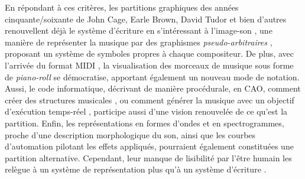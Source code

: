 En répondant à ces critères, les partitions graphiques des années cinquante/soixante de John Cage, Earle Brown, David Tudor et bien d'autres renouvellent déjà le système d'écriture en s'intéressant à l'\og image-son \fg, une manière de représenter la musique par des graphismes \textit{pseudo-arbitraires} \cite{saladin2004}, proposant un système de symboles propres à chaque compositeur.
De plus, avec l'arrivée du format MIDI \cite{midi1996}, la visualisation des morceaux de musique sous forme de \textit{piano-roll} se démocratise, apportant également un nouveau mode de notation. 
Aussi, le code informatique, décrivant de manière procédurale, en CAO, comment créer des structures musicales \cite{agon1998}, ou comment générer la musique avec un objectif d'exécution temps-réel \cite{puckette1991, mccartney1996, cont2008}, participe aussi d'une vision renouvelée de ce qu'est la partition.
Enfin, les représentations en formes d'ondes et en spectrogrammes, proche d'une description morphologique du son, ainsi que les courbes d'automation pilotant les effets appliqués, pourraient également constituées une partition alternative. Cependant, leur manque de lisibilité par l'être humain les relègue à un système de représentation plus qu'à un système d'écriture \cite{veitl2007}.

